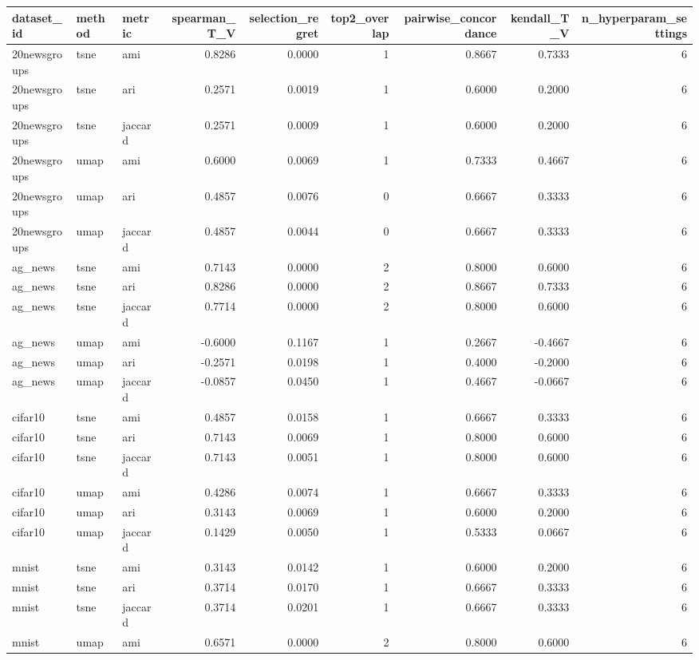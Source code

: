 \begin{tabular}{lllrrrrrr}
\toprule
dataset_id & method & metric & spearman_T_V & selection_regret & top2_overlap & pairwise_concordance & kendall_T_V & n_hyperparam_settings \\
\midrule
20newsgroups & tsne & ami & 0.8286 & 0.0000 & 1 & 0.8667 & 0.7333 & 6 \\
20newsgroups & tsne & ari & 0.2571 & 0.0019 & 1 & 0.6000 & 0.2000 & 6 \\
20newsgroups & tsne & jaccard & 0.2571 & 0.0009 & 1 & 0.6000 & 0.2000 & 6 \\
20newsgroups & umap & ami & 0.6000 & 0.0069 & 1 & 0.7333 & 0.4667 & 6 \\
20newsgroups & umap & ari & 0.4857 & 0.0076 & 0 & 0.6667 & 0.3333 & 6 \\
20newsgroups & umap & jaccard & 0.4857 & 0.0044 & 0 & 0.6667 & 0.3333 & 6 \\
ag_news & tsne & ami & 0.7143 & 0.0000 & 2 & 0.8000 & 0.6000 & 6 \\
ag_news & tsne & ari & 0.8286 & 0.0000 & 2 & 0.8667 & 0.7333 & 6 \\
ag_news & tsne & jaccard & 0.7714 & 0.0000 & 2 & 0.8000 & 0.6000 & 6 \\
ag_news & umap & ami & -0.6000 & 0.1167 & 1 & 0.2667 & -0.4667 & 6 \\
ag_news & umap & ari & -0.2571 & 0.0198 & 1 & 0.4000 & -0.2000 & 6 \\
ag_news & umap & jaccard & -0.0857 & 0.0450 & 1 & 0.4667 & -0.0667 & 6 \\
cifar10 & tsne & ami & 0.4857 & 0.0158 & 1 & 0.6667 & 0.3333 & 6 \\
cifar10 & tsne & ari & 0.7143 & 0.0069 & 1 & 0.8000 & 0.6000 & 6 \\
cifar10 & tsne & jaccard & 0.7143 & 0.0051 & 1 & 0.8000 & 0.6000 & 6 \\
cifar10 & umap & ami & 0.4286 & 0.0074 & 1 & 0.6667 & 0.3333 & 6 \\
cifar10 & umap & ari & 0.3143 & 0.0069 & 1 & 0.6000 & 0.2000 & 6 \\
cifar10 & umap & jaccard & 0.1429 & 0.0050 & 1 & 0.5333 & 0.0667 & 6 \\
mnist & tsne & ami & 0.3143 & 0.0142 & 1 & 0.6000 & 0.2000 & 6 \\
mnist & tsne & ari & 0.3714 & 0.0170 & 1 & 0.6667 & 0.3333 & 6 \\
mnist & tsne & jaccard & 0.3714 & 0.0201 & 1 & 0.6667 & 0.3333 & 6 \\
mnist & umap & ami & 0.6571 & 0.0000 & 2 & 0.8000 & 0.6000 & 6 \\

\end{tabular}

